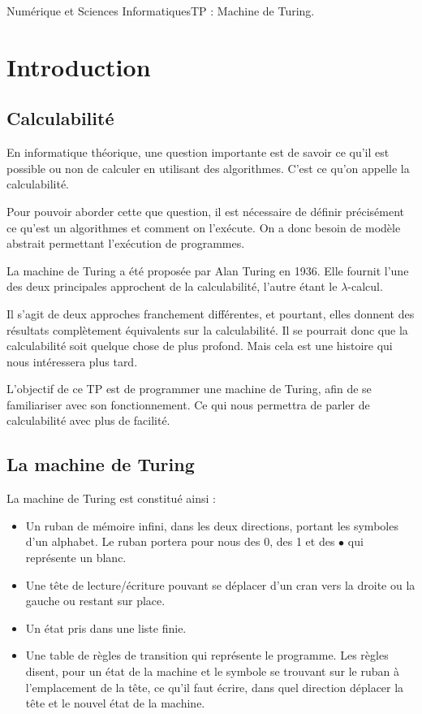 \documentclass[11pt,a4paper,french,twoside]{PMCours}
\begin{document}
{Numérique et Sciences Informatiques}{TP : Machine de Turing.}


\tableofcontents


\newpage

\section{Introduction}

\subsection{Calculabilité}
En informatique théorique, une question importante est de savoir ce qu'il est 
possible ou non de calculer en utilisant des algorithmes. C'est ce qu'on appelle
la calculabilité.

\medskip
Pour pouvoir aborder cette que question, il est nécessaire de définir précisément
ce qu'est un algorithmes et comment on l'exécute. On a donc besoin de modèle
abstrait permettant l'exécution de programmes.

\medskip
La machine de Turing a été proposée par Alan Turing en 1936. Elle fournit l'une
des deux principales approchent de la calculabilité, l'autre étant le 
$\lambda$-calcul.

\medskip
Il s'agit de deux approches franchement différentes, et pourtant, elles
donnent des résultats complètement équivalents sur la calculabilité. 
Il se pourrait donc que la calculabilité soit quelque chose de plus profond.
Mais cela est une histoire qui nous intéressera plus tard.

\medskip
L'objectif de ce TP est de programmer une machine de Turing, afin de se 
familiariser avec son fonctionnement. Ce qui nous permettra de parler de 
calculabilité avec plus de facilité.


\subsection{La machine de Turing}
La machine de Turing est constitué ainsi :
\begin{itemize}
  \item Un ruban de mémoire infini, dans les deux directions, portant les 
  symboles d'un alphabet. Le ruban portera pour nous des 0, des 1 et des $\bullet$
  qui représente un blanc.
  \item Une tête de lecture/écriture pouvant se déplacer d'un cran vers la droite
  ou la gauche ou restant sur place.
  \item Un état pris dans une liste finie.
  \item Une table de règles de transition qui représente le programme. Les règles
  disent, pour un état de la machine et le symbole se trouvant sur le ruban à 
  l'emplacement de la tête, ce qu'il faut écrire, dans quel direction déplacer 
  la tête et le nouvel état de la machine.
\end{itemize}
\end{document}
